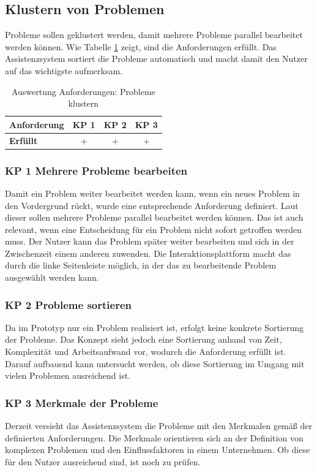 \subsection{Klustern von Problemen}
Probleme sollen geklustert werden, damit mehrere Probleme parallel bearbeitet werden können. Wie Tabelle \ref{tab:Anforderungen-Probleme} zeigt, sind die Anforderungen erfüllt. Das Assistenzsystem sortiert die Probleme automatisch und macht damit den Nutzer auf das wichtigste aufmerksam.

\begin{table}[htbp]
\caption{Auswertung Anforderungen: Probleme klustern}
\centering
\begin{tabular}{l|c|c|c}
\textbf{Anforderung} & KP 1 & KP 2 & KP 3\\
\hline
\textbf{Erfüllt} & + & + & + \\
\end{tabular}
\label{tab:Anforderungen-Probleme}
\end{table}

\subsubsection*{KP 1 Mehrere Probleme bearbeiten}
Damit ein Problem weiter bearbeitet werden kann, wenn ein neues Problem in den Vordergrund rückt, wurde eine entsprechende Anforderung definiert. Laut dieser sollen mehrere Probleme parallel bearbeitet werden können. Das ist auch relevant, wenn eine Entscheidung für ein Problem nicht sofort getroffen werden muss. Der Nutzer kann das Problem später weiter bearbeiten und sich in der Zwischenzeit einem anderen zuwenden. Die Interaktionsplattform macht das durch die linke Seitenleiste möglich, in der das zu bearbeitende Problem ausgewählt werden kann. 

\subsubsection*{KP 2 Probleme sortieren}
Da im Prototyp nur ein Problem realisiert ist, erfolgt keine konkrete Sortierung der Probleme. Das Konzept sieht jedoch eine Sortierung anhand von Zeit, Komplexität und Arbeitsaufwand vor, wodurch die Anforderung erfüllt ist. Darauf aufbauend kann untersucht werden, ob diese Sortierung im Umgang mit vielen Problemen ausreichend ist.

\subsubsection*{KP 3 Merkmale der Probleme}
Derzeit versieht das Assistenzsystem die Probleme mit den Merkmalen gemäß der definierten Anforderungen. Die Merkmale orientieren sich an der Definition von komplexen Problemen und den Einflussfaktoren in einem Unternehmen. Ob diese für den Nutzer ausreichend sind, ist noch zu prüfen.

